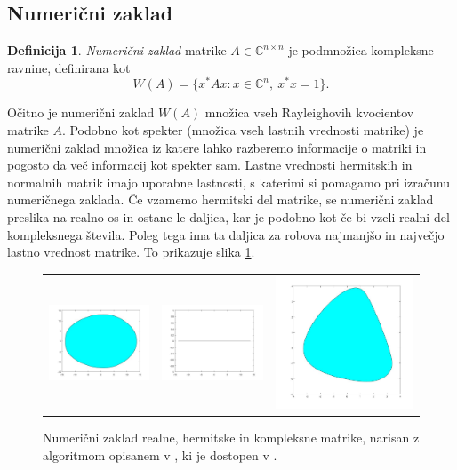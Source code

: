 \documentclass[12pt,a4paper]{amsart}
\theoremstyle{definition}
\newtheorem{definicija}{Definicija}[section]
\theoremstyle{plain}
\newcommand{\C}{\mathbb C}
\begin{document}
\subsection{Numerični zaklad}
\begin{definicija}
\emph{Numerični zaklad} matrike $A \in \C^{n\times n}$ je pod\-mno\-ži\-ca kompleksne ravnine, definirana kot
$$W(A)=\{x^\ast Ax\! : x \in \C^n,\ x^\ast x=1\}.$$
\end{definicija}
Očitno je numerični zaklad $W(A)$ množica vseh Rayleighovih kvocientov matrike $A$. Podobno kot spekter (množica vseh lastnih vrednosti matrike) je numerični zaklad množica iz katere lahko razberemo informacije o matriki in pogosto da več informacij kot spekter sam.
Lastne vrednosti hermitskih in normalnih matrik imajo uporabne lastnosti, s katerimi si pomagamo pri izračunu numeričnega zaklada.
Če vzamemo hermitski del matrike, se numerični zaklad preslika na realno os in ostane le daljica, kar je podobno kot če bi vzeli realni del kompleksnega števila. Poleg tega ima ta daljica za robova najmanjšo in največjo lastno vrednost matrike.
To prikazuje slika \ref{fig:zaklad}.\\
\begin{figure} [h]
\begin{tabular}{lll}
\includegraphics[width=.225\textwidth]{real.jpg}
&
\includegraphics[width=.225\textwidth]{hermit.jpg}
&
\includegraphics[width=.225\textwidth]{kompleks.jpg}
\end{tabular}
\caption{Numerični zaklad realne, hermitske in kompleksne matrike, narisan z algoritmom opisanem v \cite{zaloga}, ki je dostopen v \cite{nr}.}
\label{fig:zaklad}
\end{figure}
\end{document}

